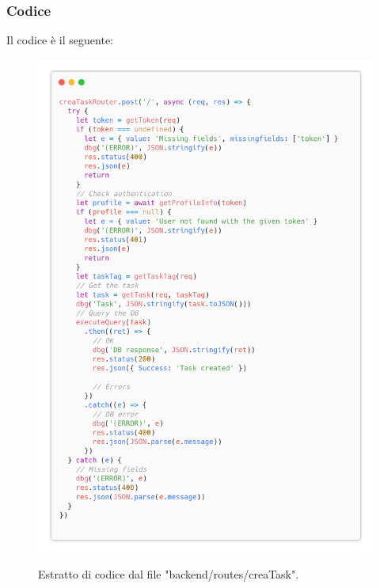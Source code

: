 \documentclass{report}
\begin{document}
\subsubsection*{Codice}

Il codice è il seguente:
\begin{figure}[H]
	\centering\includegraphics[width=1\textwidth]{images/code_crea_task.png}
	
	Estratto di codice dal file "backend/routes/creaTask".
\end{figure}
\end{document}
